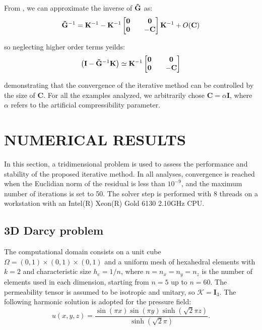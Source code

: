 \documentclass{wccm2024}
\begin{document}
From \cite{gurtin1982introduction}, we can approximate the inverse of $\mathbf{\Tilde{G}}$ as:
\vskip -0.3cm
\begin{equation}
    \mathbf{\Tilde{G}}^{-1} = \mathbf{K}^{-1}-\mathbf{K}^{-1}
    \begin{bmatrix}
        \mathbf{0} && \mathbf{0} \\
        \mathbf{0} && -\mathbf{C}
    \end{bmatrix}
    \mathbf{K}^{-1} + O(\mathbf{C})
\end{equation}

\noindent so neglecting higher order terms yeilds:
\vskip -0.3cm
\begin{equation}
    \left( \mathbf{I} - \mathbf{\Tilde{G}}^{-1} \mathbf{K} \right) \simeq \mathbf{K}^{-1}
    \begin{bmatrix}
        \mathbf{0} && \mathbf{0} \\
        \mathbf{0} && -\mathbf{C}
    \end{bmatrix}
\end{equation}

\noindent demonstrating that the convergence of the iterative method can be controlled by the size of $\mathbf{C}$. For all the examples analyzed, we arbitrarily chose $\mathbf{C}=\alpha \mathbf{I}$, where $\alpha$ refers to the artificial compressibility parameter.

\section{NUMERICAL RESULTS}

In this section, a tridimensional problem is used to assess the performance and stability of the proposed iterative method. In all analyses, convergence is reached when the Euclidian norm of the residual is less than $10^{-9}$, and the maximum number of iterations is set to 50. The solver step is performed with 8 threads on a workstation with an Intel(R) Xeon(R) Gold 6130 2.10GHz CPU.

\subsection{3D Darcy problem}

The computational domain consists on a unit cube $\Omega=(0,1)\times(0,1)\times(0,1)$ and a uniform mesh of hexahedral elements with $k=2$ and characteristic size $h_e=1/n$, where $n=n_x=n_y=n_z$ is the number of elements used in each dimension, starting from $n=5$ up to $n=60$.  The permeability tensor is assumed to be isotropic and unitary, so $\mathcal{K}=\mathbf{I}_3$. The following harmonic solution is adopted for the pressure field:
\vskip -0.3cm
\begin{equation} \label{eq:analytic-pressure}
    u(x,y,z) = \frac{\sin(\pi x) \sin(\pi y) \sinh(\sqrt{2}\pi z)}{\sinh(\sqrt{2}\pi)} \text{.}
\end{equation}
\end{document}
